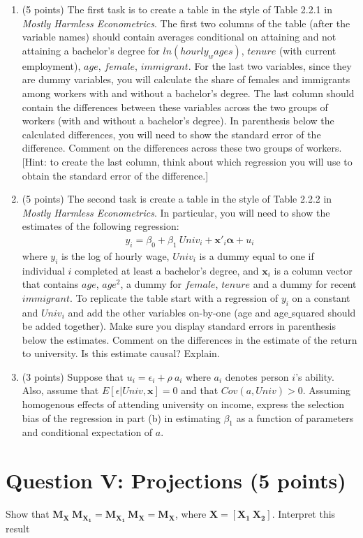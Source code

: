 \documentclass[letterpaper,12pt]{article}
\theoremstyle{dotlessS}
\begin{document}
\begin{enumerate}[label=(\alph*)]  
\item (5 points) The first task is to create a table in the style of Table 2.2.1 in \textit{Mostly Harmless Econometrics}. The first two columns of the table (after the variable names) should contain averages conditional on attaining and not attaining a bachelor's degree for $ln(hourly_wages)$, $tenure$ (with current employment), $age$, $female$, $immigrant$. For the last two variables, since they are dummy variables, you will calculate the share of females and immigrants among workers with and without a bachelor's degree. The last column should contain the differences between these variables across the two groups of workers (with and without a bachelor's degree). In parenthesis below the calculated differences, you will need to show the standard error of the difference. Comment on the differences across these two groups of workers. [Hint: to create the last column, think about which regression you will use to obtain the standard error of the difference.]    
\item (5 points) The second task is create a table in the style of Table 2.2.2  in \textit{Mostly Harmless Econometrics}. In particular, you will need to show the estimates of the following regression:
\begin{eqnarray*}
y_i=\beta_0+\beta_1 \: Univ_i+\bm{x}'_i \bm{\alpha}+u_i
\end{eqnarray*}
where $y_i$ is the log of hourly wage, $Univ_i$ is a dummy equal to one if individual $i$ completed at least a bachelor's degree, and $\bm{x}_i$ is a column vector that contains $age$, $age^2$, a dummy for $female$, $tenure$ and a dummy for recent $immigrant$. To replicate the table start with a regression of $y_i$ on a constant and $Univ_i$ and add the other variables on-by-one (age and age$\_$squared should be added together). Make sure you display standard errors in parenthesis below the estimates. Comment on the differences in the estimate of the return to university. Is this estimate causal? Explain.
\item (3 points) Suppose that $u_i=\epsilon_i+\rho \: a_i$ where $a_i$ denotes person $i$'s ability. Also, assume that $E[\epsilon|Univ, \bm{x}]=0$ and that $Cov(a,Univ)>0$. Assuming homogenous effects of attending university on income, express the selection bias of the regression in part (b) in estimating $\beta_1$ as a function of parameters and conditional expectation of $a$.         
\end{enumerate}

\section*{Question V: Projections (5 points)}
Show that $\bm{M_X \: M_{X_1}}=\bm{M_{X_1}\: M_X}=\bm{M_X}$, where $\bm{X}=[\bm{X_1} \: \bm{X_2}]$. Interpret this result
\end{document}
